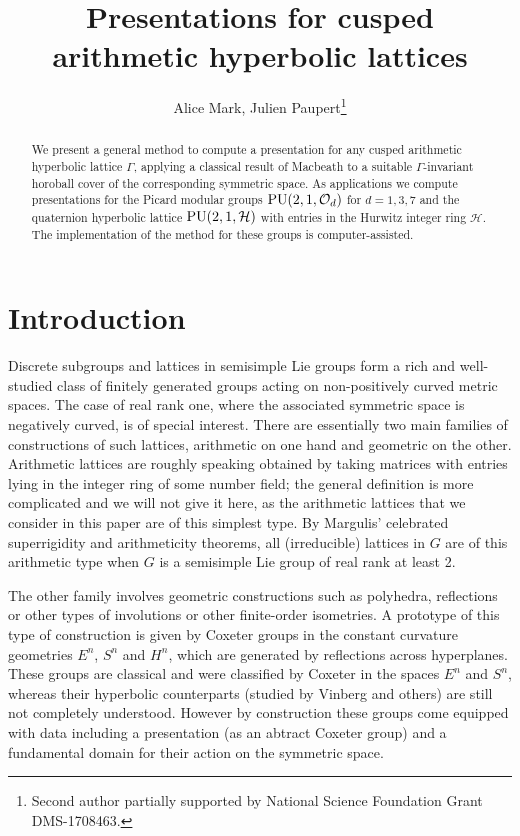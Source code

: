 \documentclass{article}[12pt]
\title{Presentations for cusped arithmetic hyperbolic lattices}
\author{Alice Mark, Julien Paupert\footnote{Second author partially supported by National Science Foundation Grant DMS-1708463.}}
\begin{document}
\maketitle

\begin{abstract}
We present a general method to compute a presentation for any cusped arithmetic hyperbolic lattice $\Gamma$, applying a classical result of Macbeath to a suitable $\Gamma$-invariant horoball cover of the corresponding symmetric space.  As applications we compute presentations for the Picard modular groups ${\rm PU}(2,1,\mathcal{O}_d)$ for $d=1,3,7$ and the quaternion hyperbolic lattice ${\rm PU}(2,1,\mathcal{H})$ with entries in the Hurwitz integer ring $\mathcal{H}$. The implementation of the method for these groups is computer-assisted.
\end{abstract}


\section{Introduction}

Discrete subgroups and lattices in semisimple Lie groups form a rich and well-studied class of finitely generated groups acting on non-positively curved metric spaces. The case of real rank one, where the associated symmetric space is negatively curved, is of special interest. There are essentially two main families of constructions of such lattices, arithmetic on one hand and geometric on the other. Arithmetic lattices are roughly speaking obtained by taking matrices with entries lying in the integer ring of some number field; the general definition is more complicated and we will not give it here, as the arithmetic lattices that we consider in this paper are of this simplest type. By Margulis' celebrated superrigidity and arithmeticity theorems, all (irreducible) lattices in $G$ are of this arithmetic type when $G$ is a semisimple Lie group of real rank at least 2. 

The other family involves geometric constructions such as polyhedra, reflections or other types of involutions or other finite-order isometries. A prototype of this type of construction is given by Coxeter groups in the constant curvature geometries $E^n$, $S^n$ and $H^n$, which are generated by reflections across hyperplanes. These groups are classical and were classified by Coxeter in the spaces $E^n$ and $S^n$, whereas their hyperbolic counterparts (studied by Vinberg and others) are still not completely understood. However by construction these groups come equipped with data including a presentation (as an abtract Coxeter group) and a fundamental domain for their action on the symmetric space.  
\end{document}

